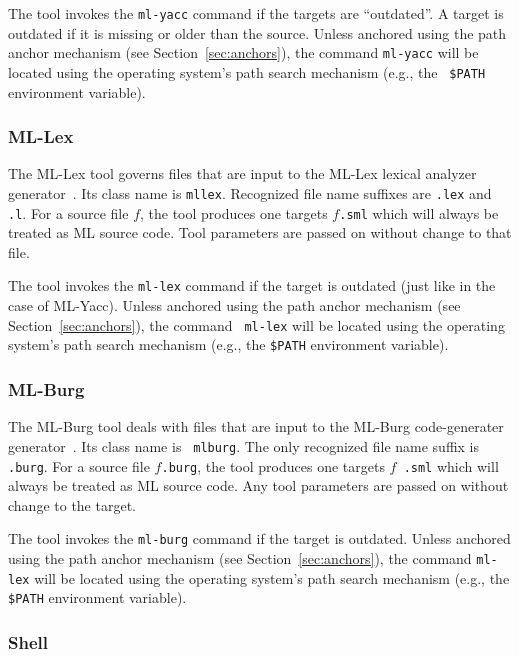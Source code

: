 \documentclass{article}
\begin{document}
The tool invokes the {\tt ml-yacc} command if the targets are
``outdated''.  A target is outdated if it is missing or older than the
source.  Unless anchored using the path anchor mechanism (see
Section~\ref{sec:anchors}), the command {\tt ml-yacc} will be located
using the operating system's path search mechanism (e.g., the {\tt
\$PATH} environment variable).

\subsubsection*{ML-Lex}

The ML-Lex tool governs files that are input to the ML-Lex lexical
analyzer generator~\cite{appel89:lex}.  Its class name is {\tt mllex}.
Recognized file name suffixes are {\tt .lex} and {\tt .l}.  For a
source file $f$, the tool produces one targets $f${\tt .sml} which
will always be treated as ML source code.  Tool parameters are passed
on without change to that file.

The tool invokes the {\tt ml-lex} command if the target is outdated
(just like in the case of ML-Yacc).  Unless anchored using the path
anchor mechanism (see Section~\ref{sec:anchors}), the command {\tt
ml-lex} will be located using the operating system's path search
mechanism (e.g., the {\tt \$PATH} environment variable).

\subsubsection*{ML-Burg}

The ML-Burg tool deals with files that are input to the ML-Burg
code-generater generator~\cite{mlburg93}.  Its class name is {\tt
mlburg}.  The only recognized file name suffix is {\tt .burg}.  For a
source file $f${\tt .burg}, the tool produces one targets $f${\tt
.sml} which will always be treated as ML source code.  Any tool
parameters are passed on without change to the target.

The tool invokes the {\tt ml-burg} command if the target is outdated.
Unless anchored using the path anchor mechanism (see
Section~\ref{sec:anchors}), the command {\tt ml-lex} will be located
using the operating system's path search mechanism (e.g., the {\tt
\$PATH} environment variable).

\subsubsection*{Shell}
\end{document}
